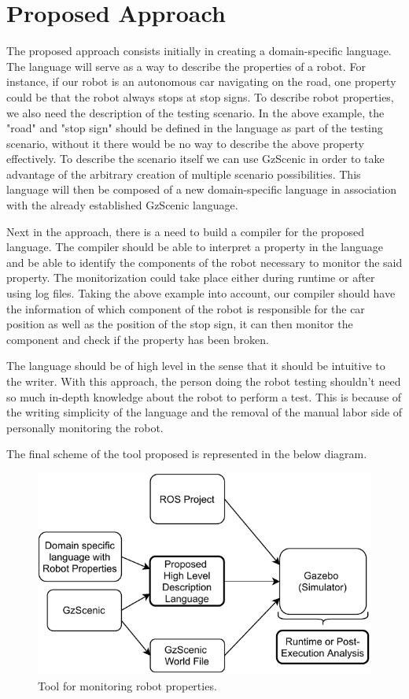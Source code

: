 \chapter{Proposed Approach}
\label{chap:approach}


The proposed approach consists initially in creating a domain-specific language.
The language will serve as a way to describe the properties of a robot.
For instance, if our robot is an autonomous car navigating on the road, 
one property could be that the robot always stops at stop signs.
To describe robot properties, we also need the description of the testing scenario.
In the above example, the "road" and "stop sign" should be defined in the language as part of the 
testing scenario, without it there would be no way to describe the above property effectively.
To describe the scenario itself we can use GzScenic in order to take 
advantage of the arbitrary creation of multiple scenario possibilities.
This language will then be composed of a new domain-specific language in association 
with the already established GzScenic language.

\par

Next in the approach, there is a need to build a compiler for the proposed language.
The compiler should be able to interpret a property in the language and be able to
identify the components of the robot necessary to monitor the said property.
The monitorization could take place either during runtime or after using log files.
Taking the above example into account, our compiler should have the information of which 
component of the robot is responsible for the car position as well as the position of the 
stop sign, it can then monitor the component and check if the property has been broken.

\par

The language should be of high level in the sense that it should be intuitive to the writer.
With this approach, the person doing the robot testing shouldn't need so much in-depth 
knowledge about the robot to perform a test. This is because of the writing simplicity of 
the language and the removal of the manual labor side of personally monitoring the robot.

\par

The final scheme of the tool proposed is represented in the below diagram.

\begin{figure}
    \includegraphics{images/intro_diag.pdf}
    \caption{Tool for monitoring robot properties.}
    \label{fig:intro_objectives}
\end{figure}
